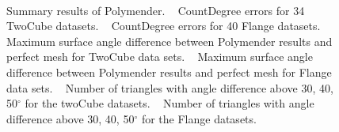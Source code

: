 \begin{figure}[p]
		\\
		\caption{Summary results of Polymender.
			~\protect{} CountDegree errors for 34 TwoCube datasets.
			~\protect{} CountDegree errors for 40 Flange datasets. 
			~\protect{} Maximum surface angle difference between Polymender results and perfect mesh for TwoCube data sets.
			~\protect{} Maximum surface angle difference between Polymender results and perfect mesh for Flange data sets.
			~\protect{} Number of triangles with angle difference above 30, 40, 50$^\circ$ for the twoCube datasets.
			~\protect{} Number of triangles with angle difference above 30, 40, 50$^\circ$ for the Flange datasets.}	
		\label{fig:polymenderA}
\end{figure}

